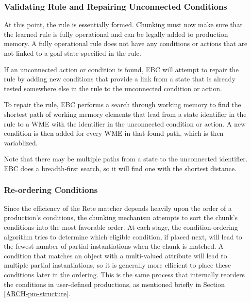\subsubsection{Validating Rule and Repairing Unconnected Conditions}
\label{CHUNKING-repair}
At this point, the rule is essentially formed.  Chunking must now make sure that the learned rule is fully operational and can be legally added to production memory.  A fully operational rule does not have any conditions or actions that are not linked to a goal state specified in the rule.

If an unconnected action or condition is found, EBC will attempt to repair the rule by adding new conditions that provide a link from a state that is already tested somewhere else in the rule to the unconnected condition or action.

To repair the rule, EBC performs a search through working memory to find the shortest path of working memory elements that lead from a state identifier in the rule to a WME with the identifier in the unconnected condition or action.  A new condition is then added for every WME in that found path, which is then variablized.

Note that there may be multiple paths from a state to the unconnected identifier.  EBC does a breadth-first search, so it will find one with the shortest distance.

\subsubsection{Re-ordering Conditions}

Since the efficiency of the Rete matcher depends heavily upon the order of a production's conditions, the chunking mechanism attempts to sort the chunk's conditions into the most favorable order. At each stage, the condition-ordering algorithm tries to determine which eligible condition, if placed next, will lead to the fewest number of partial instantiations when the chunk is matched. A condition that matches an object with a multi-valued attribute will lead to multiple partial instantiations, so it is generally more efficient to place these conditions later in the ordering.  This is the same process that internally reorders the conditions in user-defined productions, as mentioned briefly in Section \ref{ARCH-pm-structure}.


